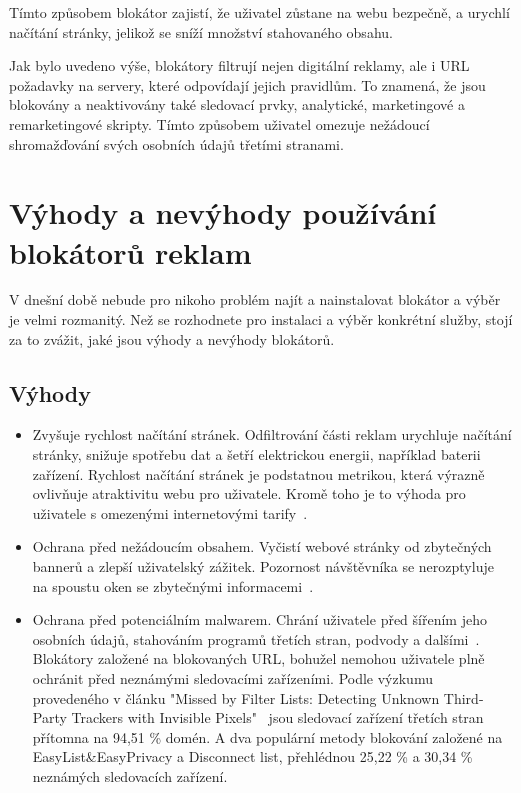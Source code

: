 Tímto způsobem blokátor zajistí, že uživatel zůstane na webu bezpečně, a urychlí načítání stránky, jelikož se sníží množství stahovaného obsahu. 

Jak bylo uvedeno výše, blokátory filtrují nejen digitální reklamy, ale i URL požadavky na servery, které odpovídají jejich pravidlům. To znamená, že jsou blokovány a neaktivovány také sledovací prvky, analytické, marketingové a remarketingové skripty. Tímto způsobem uživatel omezuje nežádoucí shromažďování svých osobních údajů třetími stranami.

\section{Výhody a nevýhody používání blokátorů reklam}
V dnešní době nebude pro nikoho problém najít a nainstalovat blokátor a výběr je velmi rozmanitý. Než se rozhodnete pro instalaci a výběr konkrétní služby, stojí za to zvážit, jaké jsou výhody a nevýhody blokátorů.

\subsection*{Výhody}
\begin{itemize}
  \item{Zvyšuje rychlost načítání stránek. Odfiltrování části reklam urychluje načítání stránky, snižuje spotřebu dat a šetří elektrickou energii, například baterii zařízení. Rychlost načítání stránek je podstatnou metrikou, která výrazně ovlivňuje atraktivitu webu pro uživatele. Kromě toho je to výhoda pro uživatele s omezenými internetovými tarify~\cite{adblock}.}
  \item{Ochrana před nežádoucím obsahem. Vyčistí webové stránky od zbytečných bannerů a zlepší uživatelský zážitek. Pozornost návštěvníka se nerozptyluje na spoustu oken se zbytečnými informacemi~\cite{adblock}.}
  \item{Ochrana před potenciálním malwarem. Chrání uživatele před šířením jeho osobních údajů, stahováním programů třetích stran, podvody a dalšími~\cite{adblock}. Blokátory založené na blokovaných URL, bohužel nemohou uživatele plně ochránit před neznámými sledovacími zařízeními. Podle výzkumu provedeného v článku "Missed by Filter Lists: Detecting Unknown
Third-Party Trackers with Invisible Pixels"~\cite{pixels} jsou sledovací zařízení třetích stran přítomna na 94,51 \% domén.  A dva populární metody blokování založené na EasyList\&EasyPrivacy a Disconnect list, přehlédnou 25,22 \% a 30,34 \% neznámých sledovacích zařízení.}
\end{itemize}


